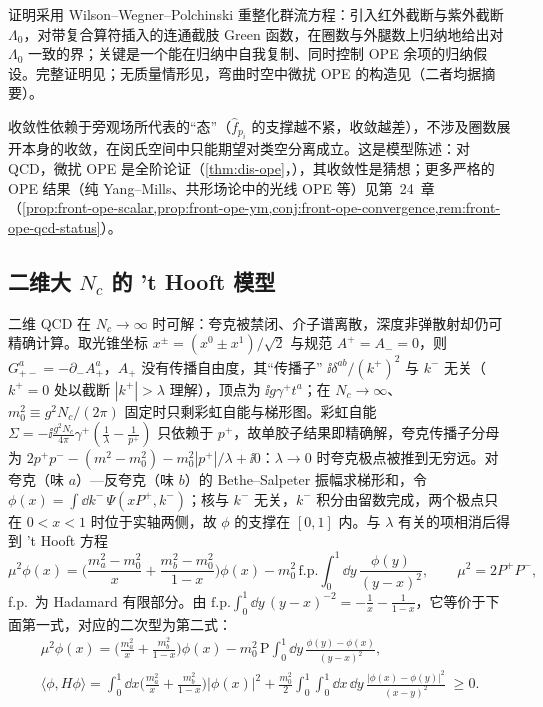 \begin{proofsketch}
证明\cite{Hollands:2011gf}采用 Wilson--Wegner--Polchinski 重整化群流方程：引入红外截断与紫外截断 $\Lambda_0$，对带复合算符插入的连通截肢 Green 函数，在圈数与外腿数上归纳地给出对 $\Lambda_0$ 一致的界；关键是一个能在归纳中自我复制、同时控制 OPE 余项的归纳假设。完整证明见\cite[定理~3 及其证明]{Hollands:2011gf}；无质量情形见\cite{Holland:2014pna}，弯曲时空中微扰 OPE 的构造见\cite{Hollands:2006ag}（二者均据摘要）。
\end{proofsketch}

收敛性依赖于旁观场所代表的“态”（$\hat f_{p_i}$ 的支撑越不紧，收敛越差），不涉及圈数展开本身的收敛，在闵氏空间中只能期望对类空分离成立\cite{Hollands:2011gf}。这是模型陈述：对 QCD，微扰 OPE 是全阶论证（\cref{thm:dis-ope}，\tagA），其收敛性是猜想；更多严格的 OPE 结果（纯 Yang--Mills、共形场论中的光线 OPE 等）见第~24~章（\cref{prop:front-ope-scalar,prop:front-ope-ym,conj:front-ope-convergence,rem:front-ope-qcd-status}）。

\subsection{二维大 \texorpdfstring{$N_c$}{Nc} 的 't Hooft 模型}

二维 QCD 在 $N_c\to\infty$ 时可解\cite{tHooft1974}：夸克被禁闭、介子谱离散，深度非弹散射却仍可精确计算。取光锥坐标 $x^\pm=(x^0\pm x^1)/\sqrt2$ 与规范 $A^+=A_-=0$，则 $G^a_{+-}=-\partial_-A^a_+$，$A_+$ 没有传播自由度，其“传播子” $\ii\delta^{ab}/(k^+)^2$ 与 $k^-$ 无关（$k^+=0$ 处以截断 $|k^+|>\lambda$ 理解），顶点为 $\ii g\gamma^+t^a$；在 $N_c\to\infty$、$m_0^2\equiv g^2N_c/(2\pi)$ 固定时只剩彩虹自能与梯形图。彩虹自能 $\Sigma=-\ii\frac{g^2N_c}{4\pi}\gamma^+(\frac1\lambda-\frac{1}{p^+})$ 只依赖于 $p^+$，故单胶子结果即精确解，夸克传播子分母为 $2p^+p^--(m^2-m_0^2)-m_0^2|p^+|/\lambda+\ii0$：$\lambda\to0$ 时夸克极点被推到无穷远。对夸克（味 $a$）—反夸克（味 $b$）的 Bethe--Salpeter 振幅求梯形和，令 $\phi(x)=\int\dd k^-\,\Psi(xP^+,k^-)$；核与 $k^-$ 无关，$k^-$ 积分由留数完成，两个极点只在 $0<x<1$ 时位于实轴两侧，故 $\phi$ 的支撑在 $[0,1]$ 内。与 $\lambda$ 有关的项相消后得到 't Hooft 方程\cite{tHooft1974}
\begin{equation}\label{eq:power-thooft-eq}
\mu^2\phi(x)=\Big(\frac{m_a^2-m_0^2}{x}+\frac{m_b^2-m_0^2}{1-x}\Big)\phi(x)-m_0^2\,\mathrm{f.p.}\!\!\int_0^1\!\dd y\,\frac{\phi(y)}{(y-x)^2},\qquad\mu^2=2P^+P^-,
\end{equation}
f.p.\ 为 Hadamard 有限部分。由 $\mathrm{f.p.}\int_0^1\dd y\,(y-x)^{-2}=-\frac1x-\frac1{1-x}$，它等价于下面第一式，对应的二次型为第二式：
\begin{gather}
\mu^2\phi(x)=\Big(\frac{m_a^2}{x}+\frac{m_b^2}{1-x}\Big)\phi(x)-m_0^2\,\mathrm{P}\!\!\int_0^1\!\dd y\,\frac{\phi(y)-\phi(x)}{(y-x)^2},\label{eq:power-thooft-pv}\\
\langle\phi,H\phi\rangle=\int_0^1\!\dd x\Big(\frac{m_a^2}{x}+\frac{m_b^2}{1-x}\Big)|\phi(x)|^2+\frac{m_0^2}{2}\int_0^1\!\!\int_0^1\!\dd x\,\dd y\,\frac{|\phi(x)-\phi(y)|^2}{(x-y)^2}\;\ge0 .\label{eq:power-thooft-form}
\end{gather}

